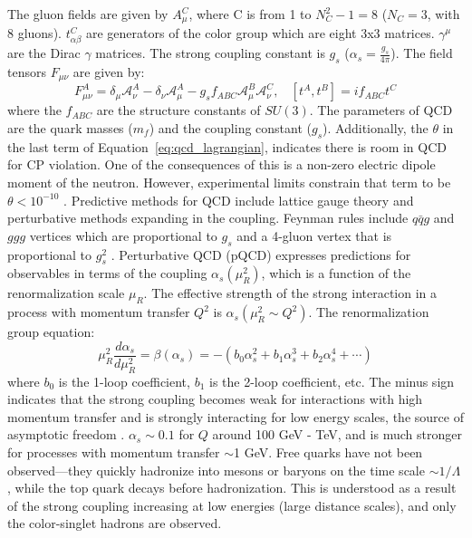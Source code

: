 The gluon fields are given by $A^C_\mu$, where C is from 1 to $N_C^2 - 1 = 8$ ($N_C = 3$, with 8 gluons). $t^C_{\alpha\beta}$ are generators of the color group which are eight 3x3 matrices. $\gamma^\mu$ are the Dirac $\gamma$ matrices. The strong coupling constant is $g_s$ ($\alpha_s = \frac{g_s}{4\pi}$).  The field tensors $F_{\mu\nu}$ are given by: 
\begin{equation}
F_{\mu\nu}^A = \delta_{\mu} \mathcal{A}^A_{\nu} - \delta_{\nu} \mathcal{A}^A_\mu - g_s f_{ABC} \mathcal{A}_\mu^B \mathcal{A}_\nu^C,~~~~ [t^A, t^B] = if_{ABC}t^C
\label{eq:qcd_field_tensors}
\end{equation}
where the $f_{ABC}$ are the structure constants of $SU(3)$. 
The parameters of QCD are the quark masses ($m_f$) and the coupling constant ($g_s$). Additionally, the $\theta$ in the last term of Equation~\ref{eq:qcd_lagrangian}, indicates there is room in QCD for CP violation. One of the consequences of this is a non-zero electric dipole moment of the neutron. However, experimental limits constrain that term to be $\theta < 10^{-10}$ \cite{PhysRevLett.97.131801}.
Predictive methods for QCD include lattice gauge theory and perturbative methods expanding in the coupling. Feynman rules include $q\bar{q}g$ and $ggg$ vertices which are proportional to $g_s$ and a 4-gluon vertex that is proportional to $g_s^2$ \cite{Ellis:1991qj}. Perturbative QCD (pQCD) expresses predictions for observables in terms of the coupling $\alpha_s(\mu_R^2)$, which is a function of the renormalization scale $\mu_R$. The effective strength of the strong interaction in a process with momentum transfer $Q^2$ is $\alpha_s(\mu_R^2 \sim Q^2)$. The renormalization group equation:
\begin{equation}
    \mu^2_R\frac{d\alpha_s}{d\mu_R^2} = \beta(\alpha_s) = -(b_0 \alpha_s^2 + b_1 \alpha_s^3 + b_2 \alpha_s^4 + \cdots)
    \label{eq:renormalization_group}
\end{equation}
where $b_0$ is the 1-loop coefficient, $b_1$ is the 2-loop coefficient, etc. The minus sign indicates that the strong coupling becomes weak for interactions with high momentum transfer and is strongly interacting for low energy scales, the source of asymptotic freedom \cite{PhysRevLett.30.1346, PhysRevLett.30.1343}. $\alpha_s \sim 0.1$ for $Q$ around 100 GeV - TeV,  and is much stronger for processes with momentum transfer $\sim$1 GeV. Free quarks have not been observed---they quickly hadronize into mesons or baryons on the time scale $\sim 1/\Lambda$, while the top quark decays before hadronization. This is understood as a result of the strong coupling increasing at low energies (large distance scales), and only the color-singlet hadrons are observed.
